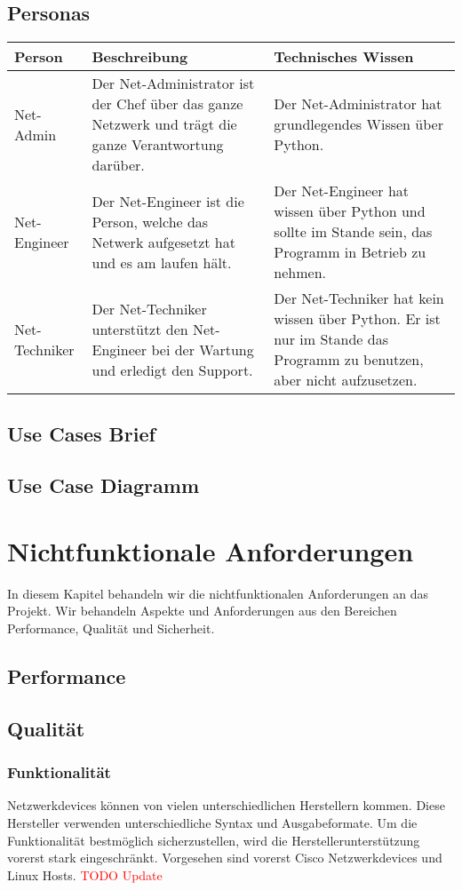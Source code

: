\documentclass[
	ngerman,
	toc=listof, %
	toc=bibliography, %
	footnotes=multiple, %
	parskip=half, %
	numbers=noendperiod %
]{scrartcl}
\begin{document}
	\subsection{Personas}
		\begin{tabularx}{\textwidth}{lXX}
			\toprule
			Person & Beschreibung & Technisches Wissen \\
			\midrule
			Net-Admin & Der Net-Administrator ist der Chef über das ganze Netzwerk und trägt die ganze Verantwortung darüber. & Der Net-Administrator hat grundlegendes Wissen über Python.\\
			\midrule
			Net-Engineer & Der Net-Engineer ist die Person, welche das Netwerk aufgesetzt hat und es am laufen hält. & Der Net-Engineer hat wissen über Python und sollte im Stande sein, das Programm in Betrieb zu nehmen. \\
			\midrule
			Net-Techniker & Der Net-Techniker unterstützt den Net-Engineer bei der Wartung und erledigt den Support. & Der Net-Techniker hat kein wissen über Python. Er ist nur im Stande das Programm zu benutzen, aber nicht aufzusetzen. \\
			\bottomrule
		\end{tabularx}

	\subsection{Use Cases Brief}

	\subsection{Use Case Diagramm}

\section{Nichtfunktionale Anforderungen}
	In diesem Kapitel behandeln wir die nichtfunktionalen Anforderungen an das Projekt.
	Wir behandeln Aspekte und Anforderungen aus den Bereichen Performance, Qualität und Sicherheit.
	
	\subsection{Performance}

	\subsection{Qualität}
		\subsubsection{Funktionalität}
		Netzwerkdevices können von vielen unterschiedlichen Herstellern kommen. 
		Diese Hersteller verwenden unterschiedliche Syntax und Ausgabeformate. 
		Um die Funktionalität bestmöglich sicherzustellen, wird die Herstellerunterstützung vorerst stark eingeschränkt. 
		Vorgesehen sind vorerst Cisco Netzwerkdevices und Linux Hosts. \textcolor{red}{TODO Update}
\end{document}
